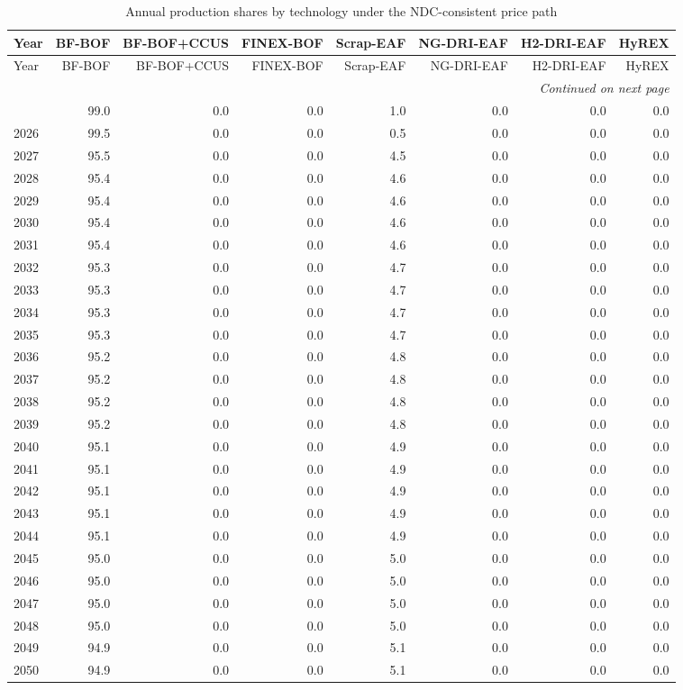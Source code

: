 \begin{longtable}{@{}lrrrrrrr@{}}
\caption{Annual production shares by technology under the NDC-consistent price path}
\label{tab:annual-shares-ngfs_ndcs}
\toprule
Year & BF-BOF & BF-BOF+CCUS & FINEX-BOF & Scrap-EAF & NG-DRI-EAF & H2-DRI-EAF & HyREX \\
\midrule
\endfirsthead
\toprule
Year & BF-BOF & BF-BOF+CCUS & FINEX-BOF & Scrap-EAF & NG-DRI-EAF & H2-DRI-EAF & HyREX \\
\midrule
\endhead
\bottomrule \multicolumn{8}{r}{\textit{Continued on next page}} \\
\endfoot
\bottomrule
\endlastfoot
2025 & 99.0 & 0.0 & 0.0 & 1.0 & 0.0 & 0.0 & 0.0 \\
2026 & 99.5 & 0.0 & 0.0 & 0.5 & 0.0 & 0.0 & 0.0 \\
2027 & 95.5 & 0.0 & 0.0 & 4.5 & 0.0 & 0.0 & 0.0 \\
2028 & 95.4 & 0.0 & 0.0 & 4.6 & 0.0 & 0.0 & 0.0 \\
2029 & 95.4 & 0.0 & 0.0 & 4.6 & 0.0 & 0.0 & 0.0 \\
2030 & 95.4 & 0.0 & 0.0 & 4.6 & 0.0 & 0.0 & 0.0 \\
2031 & 95.4 & 0.0 & 0.0 & 4.6 & 0.0 & 0.0 & 0.0 \\
2032 & 95.3 & 0.0 & 0.0 & 4.7 & 0.0 & 0.0 & 0.0 \\
2033 & 95.3 & 0.0 & 0.0 & 4.7 & 0.0 & 0.0 & 0.0 \\
2034 & 95.3 & 0.0 & 0.0 & 4.7 & 0.0 & 0.0 & 0.0 \\
2035 & 95.3 & 0.0 & 0.0 & 4.7 & 0.0 & 0.0 & 0.0 \\
2036 & 95.2 & 0.0 & 0.0 & 4.8 & 0.0 & 0.0 & 0.0 \\
2037 & 95.2 & 0.0 & 0.0 & 4.8 & 0.0 & 0.0 & 0.0 \\
2038 & 95.2 & 0.0 & 0.0 & 4.8 & 0.0 & 0.0 & 0.0 \\
2039 & 95.2 & 0.0 & 0.0 & 4.8 & 0.0 & 0.0 & 0.0 \\
2040 & 95.1 & 0.0 & 0.0 & 4.9 & 0.0 & 0.0 & 0.0 \\
2041 & 95.1 & 0.0 & 0.0 & 4.9 & 0.0 & 0.0 & 0.0 \\
2042 & 95.1 & 0.0 & 0.0 & 4.9 & 0.0 & 0.0 & 0.0 \\
2043 & 95.1 & 0.0 & 0.0 & 4.9 & 0.0 & 0.0 & 0.0 \\
2044 & 95.1 & 0.0 & 0.0 & 4.9 & 0.0 & 0.0 & 0.0 \\
2045 & 95.0 & 0.0 & 0.0 & 5.0 & 0.0 & 0.0 & 0.0 \\
2046 & 95.0 & 0.0 & 0.0 & 5.0 & 0.0 & 0.0 & 0.0 \\
2047 & 95.0 & 0.0 & 0.0 & 5.0 & 0.0 & 0.0 & 0.0 \\
2048 & 95.0 & 0.0 & 0.0 & 5.0 & 0.0 & 0.0 & 0.0 \\
2049 & 94.9 & 0.0 & 0.0 & 5.1 & 0.0 & 0.0 & 0.0 \\
2050 & 94.9 & 0.0 & 0.0 & 5.1 & 0.0 & 0.0 & 0.0 \\
\end{longtable}
